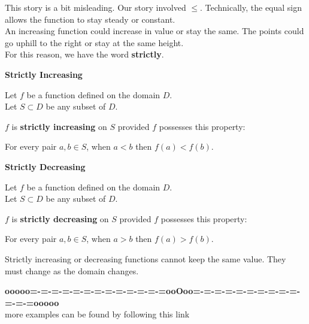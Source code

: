 \documentclass{ximera}
\begin{document}
This story is a bit misleading.  Our story involved $\leq$.  Technically, the equal sign allows the function to stay steady or constant. \\

An increasing function could increase in value or stay the same.  The points could go uphill to the right or stay at the same height. \\

For this reason, we have the word \textbf{strictly}.








\begin{definition} \textbf{\textcolor{green!50!black}{Strictly Increasing}} 


Let $f$ be a function defined on the domain $D$. \\
Let $S \subset D$ be any subset of $D$.

$f$ is \textbf{strictly increasing} on $S$ provided $f$ possesses this property:  


\begin{center}
For every pair $a, b \in S$, when $a < b$ then $f(a) < f(b)$.
\end{center}

\end{definition}








\begin{definition} \textbf{\textcolor{green!50!black}{Strictly Decreasing}} 


Let $f$ be a function defined on the domain $D$. \\
Let $S \subset D$ be any subset of $D$.

$f$ is \textbf{strictly decreasing} on $S$ provided $f$ possesses this property:  


\begin{center}
For every pair $a, b \in S$, when $a > b$ then $f(a) > f(b)$.
\end{center}

\end{definition}




Strictly increasing or decreasing functions cannot keep the same value.  They must change as the domain changes.














\begin{center}
\textbf{\textcolor{green!50!black}{ooooo=-=-=-=-=-=-=-=-=-=-=-=-=ooOoo=-=-=-=-=-=-=-=-=-=-=-=-=ooooo}} \\

more examples can be found by following this link\\ 

\end{center}
\end{document}
